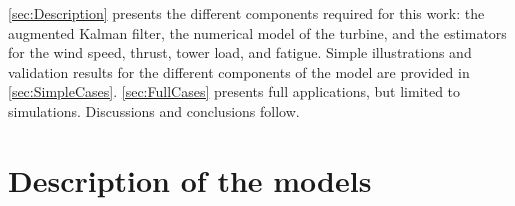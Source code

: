 \documentclass[wes, manuscript]{copernicus}
\begin{document}


\autoref{sec:Description} presents the different components required for this work: the augmented Kalman filter, the numerical model of the turbine, and the estimators for the wind speed, thrust, tower load, and fatigue.
Simple illustrations and validation results for the different components of the model are provided in \autoref{sec:SimpleCases}. \autoref{sec:FullCases} presents full applications, but limited to simulations. Discussions and conclusions follow.



\section{Description of the models}
\label{sec:Description}
\end{document}
